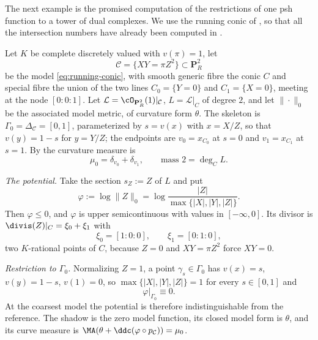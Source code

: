 The next example is the promised computation of the restrictions of one psh
function to a tower of dual complexes.  We use the running conic of
, so that all the intersection numbers have
already been computed in .

\begin{example}
\label{ex:ch21-conic-refinement}
Let $K$ be complete discretely valued with $v(\pi)=1$, let
\[
 \mathcal C=\{XY=\pi Z^2\}\subset\mathbf P^2_R
\]
be the model \eqref{eq:running-conic}, with smooth generic fibre the conic
$C$ and special fibre the union of the two lines
$C_0=\{Y=0\}$ and $C_1=\{X=0\}$, meeting at the node
$[0:0:1]$.  Let $\mathcal L=\cO_{\mathbf P^2_R}(1)|_{\mathcal C}$,
$L=\mathcal L|_C$ of degree $2$, and let $\|\cdot\|_0$ be the
associated model metric, of curvature form $\theta$.  The skeleton is
$\Gamma_0=\Delta_{\mathcal C}=[0,1]$, parameterized by
$s=v(x)$ with $x=X/Z$, so that $v(y)=1-s$ for $y=Y/Z$; the
endpoints are $v_0=x_{C_0}$ at $s=0$ and $v_1=x_{C_1}$ at $s=1$.
By  the curvature measure is
\begin{equation}
\label{eq:ch21-conic-mu0}
 \mu_0=\delta_{v_0}+\delta_{v_1},
 \qquad
 \text{mass }2=\deg_CL .
\end{equation}

\emph{The potential.}  Take the section $s_Z:=Z$ of $L$ and put
\[
 \varphi:=\log\lVert Z\rVert_0
 =\log\frac{|Z|}{\max\{|X|,|Y|,|Z|\}} .
\]
Then $\varphi\leq0$, and $\varphi$ is upper semicontinuous with values
in $[-\infty,0]$.  Its divisor is
$\divis(Z)|_C=\xi_0+\xi_1$ with
\[
 \xi_0=[1:0:0],\qquad \xi_1=[0:1:0],
\]
two $K$-rational points of $C$, because $Z=0$ and $XY=\pi Z^2$ force
$XY=0$.

\emph{Restriction to $\Gamma_0$.}  Normalizing $Z=1$, a point
$\gamma_s\in\Gamma_0$ has $v(x)=s$, $v(y)=1-s$, $v(1)=0$, so
$\max\{|X|,|Y|,|Z|\}=1$ for every $s\in[0,1]$ and
\begin{equation}
\label{eq:ch21-conic-restriction-0}
 \varphi|_{\Gamma_0}\equiv0 .
\end{equation}
At the coarsest model the potential is therefore indistinguishable from the
reference.  The shadow is the zero model function, its closed model
form is $\theta$, and its curve measure is
$\MA(\theta+\ddc(\varphi\circ p_{\mathcal C}))=\mu_0$.


\end{example}
